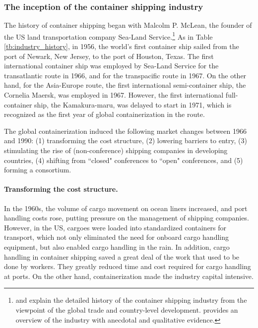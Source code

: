 \documentclass[11pt]{article}
\begin{document}
\subsubsection{The inception of the container shipping industry}\label{subsec:inception_of_container_shipping_industry}

The history of container shipping began with Malcolm P. McLean, the founder of the US land transportation company Sea-Land Service.\footnote{\cite{bernhofen2016estimating} and \cite{rua2014diffusion} explain the detailed history of the container shipping industry from the viewpoint of the global trade and country-level development. \cite{levinson2016box} provides an overview of the industry with anecdotal and qualitative evidence.}  As in Table \ref{tb:industry_history}, in 1956, the world's first container ship sailed from the port of Newark, New Jersey, to the port of Houston, Texas. The first international container ship was employed by Sea-Land Service for the transatlantic route in 1966, and for the transpacific route in 1967. On the other hand, for the Asia-Europe route, the first international semi-container ship, the Cornelia Maersk, was employed in 1967. However, the first international full-container ship, the Kamakura-maru, was delayed to start in 1971, which is recognized as the first year of global containerization in the route.

The global containerization induced the following market changes between 1966 and 1990: (1) transforming the cost structure, (2) lowering barriers to entry, (3) stimulating the rise of (non-conference) shipping companies in developing countries, (4) shifting from ``closed" conferences to ``open" conferences, and (5) forming a consortium.

\paragraph{Transforming the cost structure.}
In the 1960s, the volume of cargo movement on ocean liners increased, and port handling costs rose, putting pressure on the management of shipping companies. However, in the US, cargoes were loaded into standardized containers for transport, which not only eliminated the need for onboard cargo handling equipment, but also enabled cargo handling in the rain. In addition, cargo handling in container shipping saved a great deal of the work that used to be done by workers. They greatly reduced time and cost required for cargo handling at ports. On the other hand, containerization made the industry capital intensive.
\end{document}
